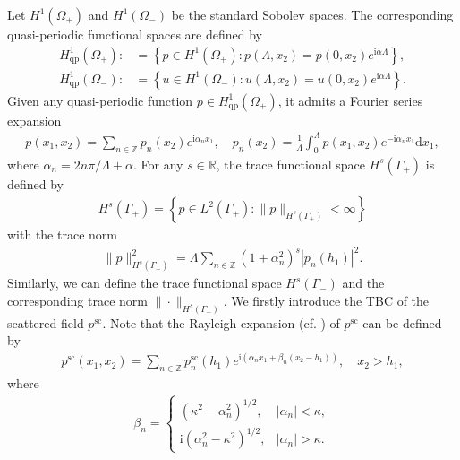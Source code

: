 \documentclass[final,3p,times]{elsarticle}
\begin{document}
Let $H^1(\Omega_+)$ and $H^1(\Omega_-)$ be the standard Sobolev spaces. The corresponding  quasi-periodic functional spaces are defined by
\begin{align*}
	H_{\mathrm{qp}}^1\left(\Omega_+\right):&=\left\{p \in H^1\left(\Omega_+\right): p\left(\Lambda, x_2\right)=p\left(0, x_2\right) e^{\mathrm{i} \alpha \Lambda}\right\},\\
	H_{\mathrm{qp}}^1\left(\Omega_-\right):&=\left\{u \in H^1\left(\Omega_-\right): u\left(\Lambda, x_2\right)=u\left(0, x_2\right) e^{\mathrm{i} \alpha \Lambda}\right\}.
\end{align*}
Given any quasi-periodic function $p \in H_{\mathrm{qp}}^1\left(\Omega_+\right)$, it admits a Fourier series expansion 
\begin{align*}
	p\left(x_1, x_2\right)=\sum_{n \in \mathbb{Z}} p_n(x_2) e^{\mathrm{i} \alpha_n x_1}, \quad p_n(x_2)=\frac{1}{\Lambda} \int_0^{\Lambda} p\left(x_1, x_2\right) e^{-\mathrm{i} \alpha_n x_1} \mathrm{d} x_1, 
\end{align*}
where $\alpha_n=2 n \pi / \Lambda + \alpha$. For any $s \in \mathbb{R}$, the trace functional space $H^s\left(\Gamma_+\right)$ is defined by
\begin{align*}
	H^s\left(\Gamma_+\right)=\left\{p \in L^2\left(\Gamma_+\right):\|p\|_{H^s\left(\Gamma_+\right)}<\infty\right\}
\end{align*}
with the trace norm 
\begin{align*}
	\|p\|_{H^s\left(\Gamma_+\right)}^2=\Lambda \sum_{n \in \mathbb{Z}}\left(1+\alpha_n^2\right)^s\left|p_n(h_1)\right|^2.
\end{align*}
Similarly, we can define the  trace functional space $H^s\left(\Gamma_-\right)$ and the corresponding trace norm $\|\cdot\|_{H^s\left(\Gamma_-\right)}$.
We firstly introduce the TBC of the scattered field $p^\mathrm{sc}$. Note that the Rayleigh expansion (cf. \cite{Wang15}) of $p^\mathrm{sc}$ can be defined by 
\begin{align}\label{ps rexp}
	p^\mathrm{sc}\left(x_1, x_2\right)=\sum_{n \in \mathbb{Z}} p_n^\mathrm{sc}\left(h_1\right) e^{\mathrm{i}\left(\alpha_n x_1+\beta_n\left(x_2-h_1\right)\right)}, \quad x_2>h_1,
\end{align}
where 
\begin{align*}
	\beta_n= \begin{cases}\left(\kappa^2-\alpha_n^2\right)^{1 / 2}, & \left|\alpha_n\right|<\kappa, \\ \mathrm{i}\left(\alpha_n^2-\kappa^2\right)^{1 / 2}, & \left|\alpha_n\right|>\kappa. \end{cases}
\end{align*}
\end{document}
